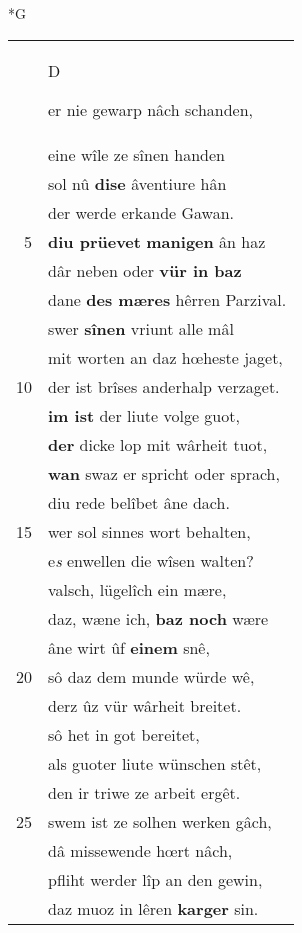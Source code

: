 \documentclass[8pt,a4paper,notitlepage]{article}
\begin{document}
\newpage
\begin{table}[ht]
\begin{minipage}[t]{0.5\linewidth}
\small
\begin{center}*G
\end{center}
\begin{tabular}{rl}
 & \begin{large}D\end{large}er nie gewarp nâch schanden,\\ 
 & eine wîle ze sînen handen\\ 
 & sol nû \textbf{dise} âventiure hân\\ 
 & der werde erkande Gawan.\\ 
5 & \textbf{diu prüevet} \textbf{manigen} ân haz\\ 
 & dâr neben oder \textbf{vür in baz}\\ 
 & dane \textbf{des mæres} hêrren Parzival.\\ 
 & swer \textbf{sînen} vriunt alle mâl\\ 
 & mit worten an daz hœheste jaget,\\ 
10 & der ist brîses anderhalp verzaget.\\ 
 & \textbf{im ist} der liute volge guot,\\ 
 & \textbf{der} dicke lop mit wârheit tuot,\\ 
 & \textbf{wan} swaz er spricht oder sprach,\\ 
 & diu rede belîbet âne dach.\\ 
15 & wer sol sinnes wort behalten,\\ 
 & e\textit{s} enwellen die wîsen walten?\\ 
 & valsch, lügelîch ein mære,\\ 
 & daz, wæne ich, \textbf{baz noch} wære\\ 
 & âne wirt ûf \textbf{einem} snê,\\ 
20 & sô daz dem munde würde wê,\\ 
 & derz ûz vür wârheit breitet.\\ 
 & sô het in got bereitet,\\ 
 & als guoter liute wünschen stêt,\\ 
 & den ir triwe ze arbeit ergêt.\\ 
25 & swem ist ze solhen werken gâch,\\ 
 & dâ missewende hœrt nâch,\\ 
 & pfliht werder lîp an den gewin,\\ 
 & daz muoz in lêren \textbf{karger} sin.\\ 

\end{tabular}
\end{minipage}
\end{table}
\end{document}
